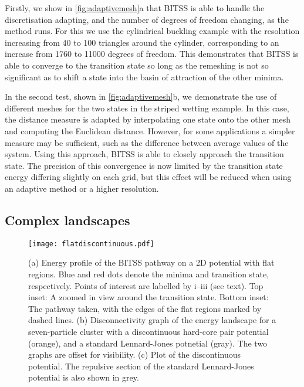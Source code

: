 \documentclass[twocolumn,10pt]{revtex4-2}
\begin{document}
Firstly, we show in \cref{fig:adaptivemesh}a that BITSS is able to handle the discretisation adapting, and the number of degrees of freedom changing, as the method runs.
For this we use the cylindrical buckling example with the resolution increasing from 40 to 100 triangles around the cylinder, corresponding to an increase from \num{1760} to \num{11000} degrees of freedom.
This demonstrates that BITSS is able to converge to the transition state so long as the remeshing is not so significant as to shift a state into the basin of attraction of the other minima.

In the second test, shown in \cref{fig:adaptivemesh}b, we demonstrate the use of different meshes for the two states in the striped wetting example.
In this case, the distance measure is adapted by interpolating one state onto the other mesh and computing the Euclidean distance.
However, for some applications a simpler measure may be sufficient, such as the difference between average values of the system.
Using this approach, BITSS is able to closely approach the transition state.
The precision of this convergence is now limited by the transition state energy differing slightly on each grid, but this effect will be reduced when using an adaptive method or a higher resolution.


\subsection{Complex landscapes}
\begin{figure}[tb]
  \texttt{[image: flatdiscontinuous.pdf]}
  \caption{\label{fig:flatdiscontinuous}
    (a) Energy profile of the BITSS pathway on a 2D potential with flat regions.
        Blue and red dots denote the minima and transition state, respectively.
        Points of interest are labelled by i--iii (see text).
        Top inset: A zoomed in view around the transition state.
        Bottom inset: The pathway taken, with the edges of the flat regions marked by dashed lines.
    (b) Disconnectivity graph of the energy landscape for a seven-particle cluster with a discontinuous hard-core pair potential (orange), and a standard Lennard-Jones potnetial (gray).
        The two graphs are offset for visibility.
    (c) Plot of the discontinuous potential.
        The repulsive section of the standard Lennard-Jones potential is also shown in grey.
  }
\end{figure}
\end{document}
